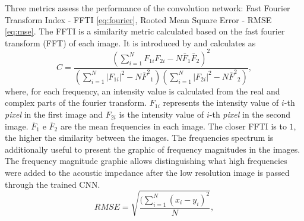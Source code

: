 \documentclass[conference]{IEEEtran}
\begin{document}
Three metrics assess the performance of the convolution network: Fast Fourier Transform Index - FFTI \eqref{eq:fourier},
Rooted Mean Square Error - RMSE \ref{eq:mse}. 
The FFTI is a similarity metric calculated based on the fast fourier transform (FFT) of each image.
It is introduced by \cite{Naranyana2015} and calculates as 
\begin{equation}
 C = \frac{ (\sum_{i=1}^{N}{F_{1i}F_{2i}} - N \bar{F}_1\bar{F}_2 )^2 }{ (\sum_{i=1}^{N}{|F_{1i}|^2} - N{\bar{F}^2}_1)( \sum_{i=1}^{N}{|F_{2i}|^2} - N{\bar{F}^2}_2 )},
 \label{eq:fourier}
\end{equation}
where, for each frequency, an intensity value is calculated from the real and complex parts of the fourier
transform. $F_{1i}$ represents the intensity value of $i$-th \textit{pixel} in the first image and $F_{2i}$
is the intensity value of $i$-th \textit{pixel} in the second image. $\bar{F}_1$ e $\bar{F}_2$ are the mean
frequencies in each image. The closer FFTI is to $1$, the higher the similarity between the images.
The frequencies spectrum is additionally useful to present the graphic of frequency magnitudes in the images.
The frequency magnitude graphic allows distinguishing what high frequencies were added to the acoustic impedance
after the low resolution image is passed through the trained CNN. 
\begin{equation}
 RMSE = \sqrt{\frac{ (\sum_{i=1}^{N}{(x_i -y_i)^2 } }{N}},
 \label{eq:mse}
\end{equation}
\end{document}
